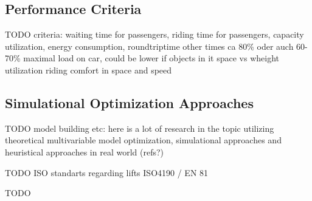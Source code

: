 \subsection{Performance Criteria}
TODO
criteria: waiting time for passengers, riding time for passengers, capacity utilization, energy consumption, roundtriptime other times
ca 80\% oder auch 60-70\% maximal load on car, could be lower if objects in it
space vs wheight utilization
riding comfort in space and speed

\subsection{Simulational Optimization Approaches}
TODO
model building etc: here is a lot of research in the topic utilizing theoretical multivariable model optimization, simulational approaches and heuristical approaches in real world (refs?)

TODO
ISO standarts regarding lifts ISO4190 / EN 81

TODO
